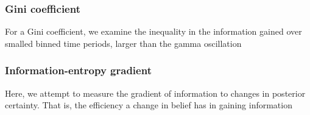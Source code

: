 \subsubsection*{Gini coefficient}
For a Gini coefficient, we examine the inequality in the information gained over smalled binned time periods, larger than the gamma oscillation
\subsubsection*{Information-entropy gradient}
Here, we attempt to measure the gradient of information to changes in posterior certainty. That is, the efficiency a change in belief has in gaining information
